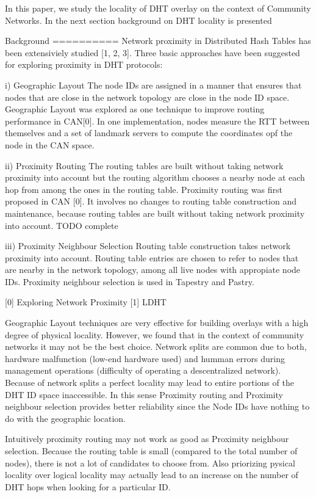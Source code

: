 In this paper, we study the locality of DHT overlay on the context of Community Networks. In the next section background on DHT locality is presented


Background
==========
Network proximity in Distributed Hash Tables has been extensiviely studied [1, 2, 3]. Three basic approaches have been suggested for exploring proximity in DHT protocols:

i) Geographic Layout
The node IDs are assigned in a manner that ensures that nodes that are close in the network topology are close in the node ID space. Geographic Layout was explored as one technique to improve routing performance in CAN[0]. In one implementation, nodes measure the RTT between themselves and a set of landmark servers to compute the coordinates opf the node in the CAN space.

ii) Proximity Routing
The routing tables are built without taking network proximity into account but the routing algorithm chooses a nearby node at each hop from among the ones in the routing table. Proximity routing was first proposed in CAN [0]. It involves no changes to routing table construction and maintenance, because routing tables are built without taking network proximity into account. TODO complete

iii) Proximity Neighbour Selection
Routing table construction takes network proximity into account. Routing table entries are chosen to refer to nodes that are nearby in the network topology, among all live nodes with appropiate node IDs. Proximity neighbour selection is used in Tapestry and Pastry.

[0] Exploring Network Proximity
[1] LDHT

Geographic Layout techniques are very effective for building overlays with a high degree of physical locality. However, we found that in the context of community networks it may not be the best choice. Network splits are common due to both, hardware malfunction (low-end hardware used) and humman errors during management operations (difficulty of operating a descentralized network). Because of network splits a perfect locality may lead to entire portions of the DHT ID space inaccessible. In this sense Proximity routing and Proximity neighbour selection provides better reliability since the Node IDs have nothing to do with the geographic location.

Intuitively proximity routing may not work as good as Proximity neighbour selection. Because the routing table is small (compared to the total number of nodes), there is not a lot of candidates to choose from. Also priorizing pysical locality over logical locality may actually lead to an increase on the number of DHT hops when looking for a particular ID.

